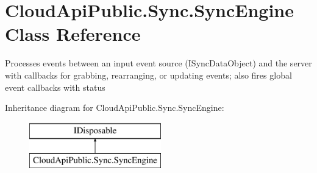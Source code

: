 \hypertarget{class_cloud_api_public_1_1_sync_1_1_sync_engine}{\section{Cloud\-Api\-Public.\-Sync.\-Sync\-Engine Class Reference}
\label{class_cloud_api_public_1_1_sync_1_1_sync_engine}
}


Processes events between an input event source (I\-Sync\-Data\-Object) and the server with callbacks for grabbing, rearranging, or updating events; also fires global event callbacks with status  


Inheritance diagram for Cloud\-Api\-Public.\-Sync.\-Sync\-Engine\-:\begin{figure}[H]
\begin{center}
\leavevmode
\includegraphics[height=2.000000cm]{class_cloud_api_public_1_1_sync_1_1_sync_engine}
\end{center}
\end{figure}
